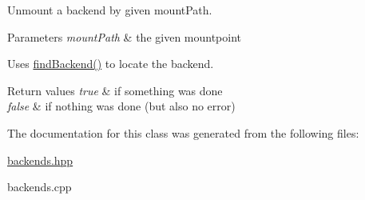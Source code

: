 Unmount a backend by given mount\+Path. 


\begin{DoxyParams}{Parameters}
{\em mount\+Path} & the given mountpoint\\
\hline
\end{DoxyParams}
Uses \hyperlink{classkdb_1_1tools_1_1Backends_a692f3f6b5f01ed2e497a6e093e1e2e90}{find\+Backend()} to locate the backend.


\begin{DoxyRetVals}{Return values}
{\em true} & if something was done \\
\hline
{\em false} & if nothing was done (but also no error) \\
\hline
\end{DoxyRetVals}


The documentation for this class was generated from the following files\+:\begin{DoxyCompactItemize}
\item 
\hyperlink{backends_8hpp}{backends.\+hpp}\item 
backends.\+cpp\end{DoxyCompactItemize}
